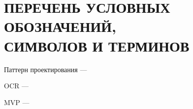\section*{%
  ПЕРЕЧЕНЬ УСЛОВНЫХ ОБОЗНАЧЕНИЙ, \\
  СИМВОЛОВ  И ТЕРМИНОВ}

Паттерн проектирования ---

OCR ---

MVP ---
